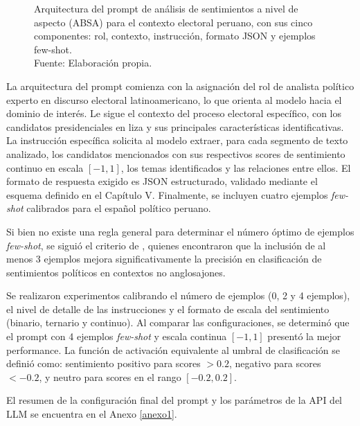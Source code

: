 \begin{figure}[!ht]
    \begin{center}
        \resizebox{0.85\textwidth}{!}{}
        \caption[Arquitectura del prompt ABSA para análisis de sentimientos electorales]{Arquitectura del prompt de análisis de sentimientos a nivel de aspecto (ABSA) para el contexto electoral peruano, con sus cinco componentes: rol, contexto, instrucción, formato JSON y ejemplos few-shot.\\Fuente: Elaboración propia.}
        \label{6:fig1}
    \end{center}
\end{figure}

La arquitectura del prompt comienza con la asignación del rol de analista político
experto en discurso electoral latinoamericano, lo que orienta al modelo hacia el
dominio de interés. Le sigue el contexto del proceso electoral específico, con los
candidatos presidenciales en liza y sus principales características identificativas.
La instrucción específica solicita al modelo extraer, para cada segmento de texto
analizado, los candidatos mencionados con sus respectivos scores de sentimiento
continuo en escala $[-1, 1]$, los temas identificados y las relaciones entre ellos.
El formato de respuesta exigido es JSON estructurado, validado mediante el esquema
definido en el Capítulo V. Finalmente, se incluyen cuatro ejemplos \textit{few-shot}
calibrados para el español político peruano.

Si bien no existe una regla general para determinar el número óptimo de ejemplos
\textit{few-shot}, se siguió el criterio de \cite{pr_gujral2024llm_elections}, quienes
encontraron que la inclusión de al menos 3 ejemplos mejora significativamente la
precisión en clasificación de sentimientos políticos en contextos no anglosajones.

Se realizaron experimentos calibrando el número de ejemplos (0, 2 y 4 ejemplos), el
nivel de detalle de las instrucciones y el formato de escala del sentimiento (binario,
ternario y continuo). Al comparar las configuraciones, se determinó que el prompt con
4 ejemplos \textit{few-shot} y escala continua $[-1, 1]$ presentó la mejor performance.
La función de activación equivalente al umbral de clasificación se definió como:
sentimiento positivo para scores $> 0.2$, negativo para scores $< -0.2$, y neutro para
scores en el rango $[-0.2, 0.2]$.

El resumen de la configuración final del prompt y los parámetros de la API del LLM
se encuentra en el Anexo \ref{anexo1}.

